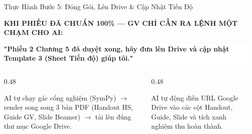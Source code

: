 \documentclass[aspectratio=169,11pt]{beamer}
\begin{document}
\begin{frame}{Thực Hành Bước 5: Đóng Gói, Lên Drive \& Cập Nhật Tiến Độ}
  \begin{tcolorbox}[successcard]
    \scriptsize\centering
    \textbf{KHI PHIẾU ĐÃ CHUẨN 100\% — GV CHỈ CẦN RA LỆNH MỘT CHẠM CHO AI:}\\
    \colorbox{white}{\parbox{0.92\linewidth}{\centering\color{success}\bfseries\scriptsize "Phiếu 2 Chương 5 đã duyệt xong, hãy đưa lên Drive và cập nhật Template 3 (Sheet Tiến độ) giúp tôi."}}
  \end{tcolorbox}
  \vspace{1pt}
  \begin{columns}[T]
    \begin{column}{0.48\textwidth}
      \begin{tcolorbox}[slidecard, title=1. Tự Động Build \& Xuất Bản]
        \scriptsize
        AI tự chạy gác cổng nghiệm (SymPy) $\to$ render song song 3 bản PDF (Handout HS, Guide GV, Slide Beamer) $\to$ tải lên đúng thư mục Google Drive.
      \end{tcolorbox}
    \end{column}

    \begin{column}{0.48\textwidth}
      \begin{tcolorbox}[slidecard, title=2. Cập Nhật Sheet Tiến Độ]
        \scriptsize
        AI tự động điền URL Google Drive vào các cột Handout, Guide, Slide và tích xanh nghiệm thu hoàn thành.
      \end{tcolorbox}
    \end{column}
  \end{columns}
\end{frame}
\end{document}
